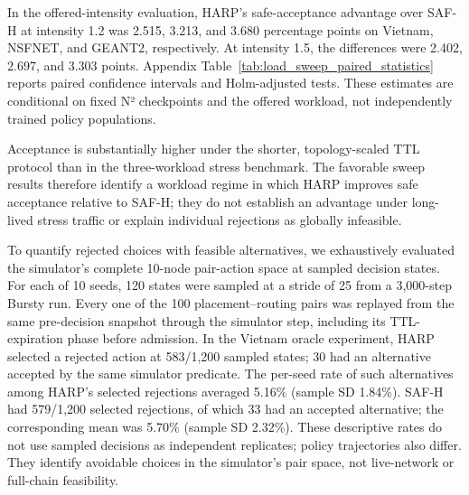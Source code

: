 \documentclass[final,5p]{elsarticle}
\newcommand{\rev}[1]{\textcolor{revisiongreen}{#1}}
\let\newrev\rev
\begin{document}
\newrev{In the offered-intensity evaluation, HARP's safe-acceptance advantage over SAF-H at intensity 1.2 was 2.515, 3.213, and 3.680 percentage points on Vietnam, NSFNET, and GEANT2, respectively. At intensity 1.5, the differences were 2.402, 2.697, and 3.303 points. Appendix Table~\ref{tab:load_sweep_paired_statistics} reports paired confidence intervals and Holm-adjusted tests. These estimates are conditional on fixed N² checkpoints and the offered workload, not independently trained policy populations.}

\newrev{Acceptance is substantially higher under the shorter, topology-scaled TTL protocol than in the three-workload stress benchmark. The favorable sweep results therefore identify a workload regime in which HARP improves safe acceptance relative to SAF-H; they do not establish an advantage under long-lived stress traffic or explain individual rejections as globally infeasible.}

\newrev{To quantify rejected choices with feasible alternatives, we exhaustively evaluated the simulator's complete 10-node pair-action space at sampled decision states. For each of 10 seeds, 120 states were sampled at a stride of 25 from a 3,000-step Bursty run. Every one of the 100 placement--routing pairs was replayed from the same pre-decision snapshot through the simulator step, including its TTL-expiration phase before admission. In the Vietnam oracle experiment, HARP selected a rejected action at 583/1,200 sampled states; 30 had an alternative accepted by the same simulator predicate. The per-seed rate of such alternatives among HARP's selected rejections averaged 5.16\% (sample SD 1.84\%). SAF-H had 579/1,200 selected rejections, of which 33 had an accepted alternative; the corresponding mean was 5.70\% (sample SD 2.32\%). These descriptive rates do not use sampled decisions as independent replicates; policy trajectories also differ. They identify avoidable choices in the simulator's pair space, not live-network or full-chain feasibility.}

\begin{table}[t]
\centering
\caption{\newrev{Sampled exhaustive pair-action oracle on Vietnam (10 seeds; 120 states per seed). Conditional rates are seed-level means with sample SD.}}
\label{tab:missed_feasible_oracle}
\scriptsize
{\color{revisiongreen}
\setlength{\tabcolsep}{3pt}
}
\end{table}
\end{document}
